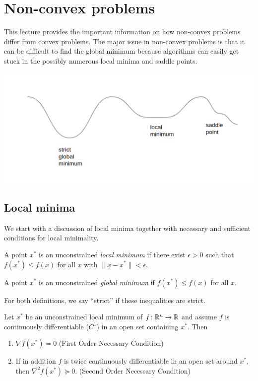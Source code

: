\section{Non-convex problems}

This lecture provides the important information on how non-convex problems differ from convex problems. The major issue in non-convex problems is that it can be difficult to find the global minimum because algorithms can easily get stuck in the possibly numerous local minima and saddle points.

\begin{center}
\includegraphics[width=1.0\linewidth, height=0.4\linewidth]{figures/lecture_17_non_convex_graph.pdf} 
\end{center}

\subsection{Local minima}

We start with a discussion of local minima together with necessary and
sufficient conditions for local minimality.

\begin{definition}
A point $x^*$ is an unconstrained \textit{local minimum} if there exist $\epsilon > 0$ such that $f(x^*) \le f(x)$ for all $x$ with $\|x - x^*\| < \epsilon$.
\end{definition}

\begin{definition}
A point $x^*$ is an unconstrained \textit{global minimum} if $f(x^*) \le f(x)$ for all $x$.
\end{definition}

For both definitions, we say ``strict'' if these inequalities are strict.

\begin{proposition}
Let $x^*$ be an unconstrained local minimum of $f\colon \mathbb{R}^n \to\mathbb{R}$ and assume $f$ is continuously differentiable ($C^1$) in an open set containing $x^*$. Then
\begin{enumerate}
    \item $\nabla f(x^*) = 0$ (First-Order Necessary Condition)
    \item If in addition $f$ is twice continuously differentiable in an open set around $x^*$, then $\nabla^2f(x^*) \succeq 0$. (Second Order Necessary Condition)
\end{enumerate}
\end{proposition}

